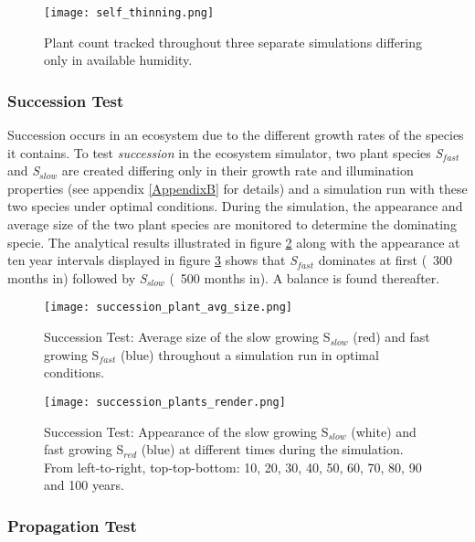 \begin{figure}
\center
	\texttt{[image: self\_thinning.png]}
	\caption{ Plant count tracked throughout three separate simulations differing only in available humidity. }
	\label{fig:self_thinning_test_results}
\end{figure}

\subsubsection{Succession Test}

Succession occurs in an ecosystem due to the different growth rates of the species it contains. To test \textit{succession} in the ecosystem simulator, two plant species \textit{S$_{fast}$} and \textit{S$_{slow}$} are created differing only in their growth rate and illumination properties (see appendix \ref{AppendixB} for details) and a simulation run with these two species under optimal conditions. During the simulation, the appearance and average size of the two plant species are monitored to determine the dominating specie. The analytical results illustrated in figure \ref{fig:succession_plants_avg_size} along with the appearance at ten year intervals displayed in figure \ref{fig:succession_plants_render} shows that \textit{S$_{fast}$} dominates at first (~300 months in) followed by \textit{S$_{slow}$} (~500 months in). A balance is found thereafter.

\begin{figure}
\center
	\texttt{[image: succession\_plant\_avg\_size.png]}
	\caption{ Succession Test: Average size of the slow growing S$_{slow}$ (red) and fast growing S$_{fast}$ (blue) throughout a simulation run in optimal conditions. }
	\label{fig:succession_plants_avg_size}
\end{figure}

\begin{figure}
\center
	\texttt{[image: succession\_plants\_render.png]}
	\caption{ Succession Test: Appearance of the slow growing S$_{slow}$ (white) and fast growing S$_{red}$ (blue) at different times during the simulation. From left-to-right, top-top-bottom: 10, 20, 30, 40, 50, 60, 70, 80, 90 and 100 years.}
	\label{fig:succession_plants_render}
\end{figure}

\subsubsection{Propagation Test}


